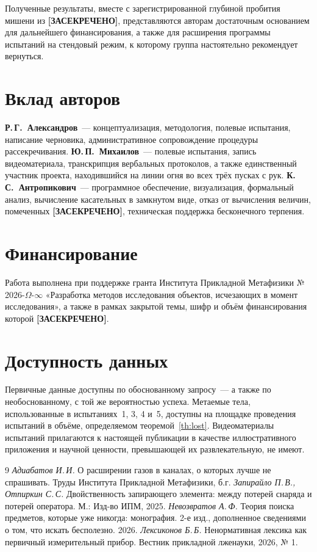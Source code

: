 \documentclass[11pt,a4paper]{article}
\newcommand{\SEC}{\textbf{[ЗАСЕКРЕЧЕНО]}}
\begin{document}
Полученные результаты, вместе с зарегистрированной глубиной пробития мишени из \SEC, представляются авторам достаточным основанием для дальнейшего финансирования, а также для расширения программы испытаний на стендовый режим, к которому группа настоятельно рекомендует вернуться.

\section*{Вклад авторов}
\textbf{Р.\,Г.~Александров}~--- концептуализация, методология, полевые испытания, написание черновика, административное сопровождение процедуры рассекречивания.
\textbf{Ю.\,П.~Михаилов}~--- полевые испытания, запись видеоматериала, транскрипция вербальных протоколов, а также единственный участник проекта, находившийся на линии огня во всех трёх пусках с рук.
\textbf{К.\,С.~Антропикович}~--- программное обеспечение, визуализация, формальный анализ, вычисление касательных в замкнутом виде, отказ от вычисления величин, помеченных \SEC, техническая поддержка бесконечного терпения.

\section*{Финансирование}
Работа выполнена при поддержке гранта Института Прикладной Метафизики № 2026-$\Omega$-$\infty$ «Разработка методов исследования объектов, исчезающих в момент исследования», а также в рамках закрытой темы, шифр и объём финансирования которой \SEC.

\section*{Доступность данных}
Первичные данные доступны по обоснованному запросу~--- а также по необоснованному, с той же вероятностью успеха. Метаемые тела, использованные в испытаниях~1, 3, 4 и~5, доступны на площадке проведения испытаний в объёме, определяемом теоремой~\ref{th:lost}. Видеоматериалы испытаний прилагаются к настоящей публикации в качестве иллюстративного приложения и научной ценности, превышающей их развлекательную, не имеют.

\begin{thebibliography}{9}
 \emph{Адиабатов И.\,И.} О расширении газов в каналах, о которых лучше не спрашивать. Труды Института Прикладной Метафизики, б.г.
 \emph{Запирайло П.\,В., Отпиркин С.\,С.} Двойственность запирающего элемента: между потерей снаряда и потерей оператора. М.: Изд-во ИПМ, 2025.
 \emph{Невозвратов А.\,Ф.} Теория поиска предметов, которые уже никогда: монография. 2-е изд., дополненное сведениями о том, что искать бесполезно. 2026.
 \emph{Лексиконов Б.\,Б.} Ненормативная лексика как первичный измерительный прибор. Вестник прикладной лженауки, 2026, № 1.
\end{thebibliography}
\end{document}

